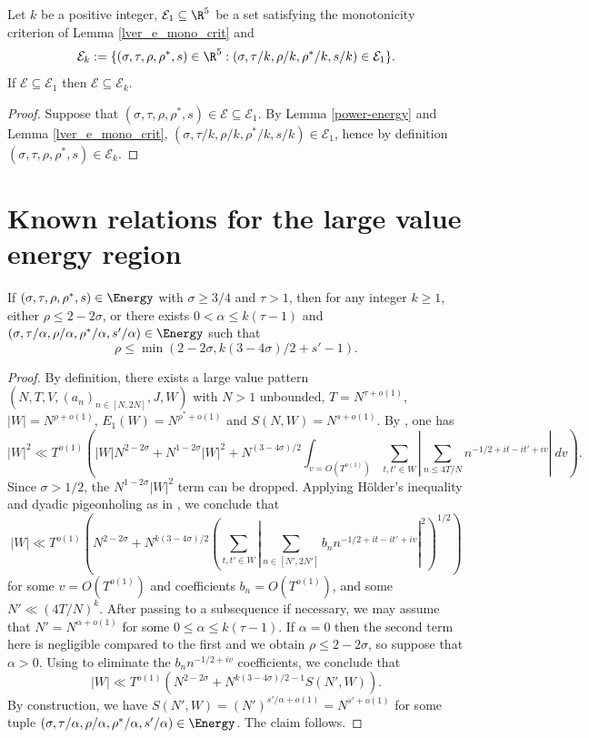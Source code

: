 \begin{lemma}
Let $k$ be a positive integer, $\mathcal{E}_1 \subseteq \R^{5}$ be a set satisfying the monotonicity criterion of Lemma \ref{lver_e_mono_crit} and
\[
\mathcal{E}_k := \{(\sigma, \tau, \rho, \rho^*, s) \in \R^5: (\sigma, \tau/k, \rho/k, \rho^*/k, s/k) \in \mathcal{E}_1\}.
\]
If $\mathcal{E}\subseteq \mathcal{E}_1$ then $\mathcal{E} \subseteq \mathcal{E}_k$.
\end{lemma}
\begin{proof}
Suppose that $(\sigma, \tau, \rho, \rho^*, s) \in \mathcal{E}\subseteq \mathcal{E}_1$. By Lemma \ref{power-energy} and Lemma \ref{lver_e_mono_crit}, $(\sigma, \tau/k, \rho/k, \rho^*/k, s/k) \in \mathcal{E}_1$, hence by definition $(\sigma, \tau, \rho, \rho^*, s) \in \mathcal{E}_k$.
\end{proof}
\section{Known relations for the large value energy region}

\begin{theorem}\label{reflect}\cite[\S 11.5]{ivic} If $(\sigma,\tau,\rho,\rho^*,s) \in \Energy$ with $\sigma \geq 3/4$ and $\tau>1$, then for any integer $k \geq 1$, either $\rho \leq 2-2\sigma$, or there exists $0 < \alpha \leq k(\tau-1)$ and $(\sigma, \tau/\alpha, \rho/\alpha, \rho^*/\alpha, s'/\alpha) \in \Energy$ such that
$$ \rho \leq \min( 2-2\sigma, k(3-4\sigma)/2 + s' - 1).$$
\end{theorem}

\begin{proof} By definition, there exists a large value pattern $(N,T,V,(a_n)_{n \in [N,2N]},J,W)$ with $N>1$ unbounded, $T = N^{\tau+o(1)}$, $|W| = N^{\rho+o(1)}$, $E_1(W) = N^{\rho^*+o(1)}$ and $S(N,W) = N^{s+o(1)}$.  By \cite[(11.58)]{ivic}, one has
$$ |W|^2 \ll T^{o(1)} \left( |W| N^{2-2\sigma} + N^{1-2\sigma} |W|^2 + N^{(3-4\sigma)/2} \int_{v = O(T^{o(1)})} \sum_{t,t' \in W} \left|\sum_{n \leq 4T/N} n^{-1/2+it-it'+iv}\right|\ dv \right).$$
Since $\sigma>1/2$, the $N^{1-2\sigma} |W|^2$ term can be dropped.  Applying H\"older's inequality and dyadic pigeonholing as in \cite[(11.59)]{ivic}, we conclude that
$$ |W| \ll T^{o(1)} \left(N^{2-2\sigma} + N^{k(3-4\sigma)/2}  \left(\sum_{t,t' \in W} \left|\sum_{n \in [N',2N']} b_n n^{-1/2+it-it'+iv}\right|^2\right)^{1/2}\right)$$
for some $v = O(T^{o(1)})$ and coefficients $b_n = O(T^{o(1)})$, and some $N' \ll (4T/N)^k$.  After passing to a subsequence if necessary, we may assume that $N' = N^{\alpha+o(1)}$ for some $0 \leq \alpha \leq k(\tau-1)$.  If $\alpha=0$ then the second term here is negligible compared to the first and we obtain $\rho \leq 2-2\sigma$, so suppose that $\alpha > 0$.  Using \cite[Lemma 11.1]{ivic} to eliminate the $b_n n^{-1/2+iv}$ coefficients, we conclude that
$$ |W| \ll T^{o(1)} (N^{2-2\sigma} + N^{k(3-4\sigma)/2-1} S(N', W)).$$
By construction, we have $S(N',W) = (N')^{s'/\alpha+o(1)} = N^{s'+o(1)}$ for some tuple $(\sigma, \tau/\alpha, \rho/\alpha, \rho^*/\alpha, s'/\alpha) \in \Energy$.  The claim follows.
\end{proof}

